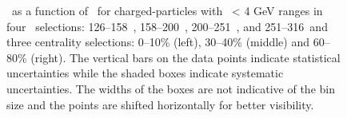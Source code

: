 
\begin{figure}
   \caption{\DeltaTheta\ as a function of \rvar\ for charged-particles with \pt\ < 4 GeV ranges in 
   four \ptjet\ selections: 126--158~\GeV, 158--200~\GeV, 200--251~\GeV, and 251--316~\GeV and three centrality 
   selections: 0--10\% (left), 30--40\% (middle) and 60--80\% (right).
   The vertical bars on the data points indicate statistical uncertainties while the shaded boxes indicate systematic uncertainties.
The widths of the boxes are not indicative of the bin size and the points are shifted horizontally for better visibility.
}
      \label{fig:deltaPdeltaT}
\end{figure}


